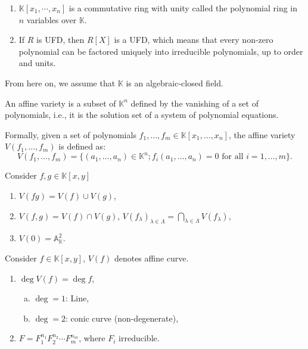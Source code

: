 \documentclass[10pt]{article}
\begin{document}
\begin{definition}

\end{definition}

\begin{proposition}
  \begin{enumerate}[(1)]
    \item   $ \mathbb{K}[x_1,\cdots ,x_{n}]$ is a commutative ring with unity called the polynomial ring in $ n$ variables over $ \mathbb{K}$.
    \item If $ R$ is UFD, then $ R[X]$ is a UFD, which means that every non-zero polynomial can be factored uniquely into irreducible polynomials, up to order and units.
  \end{enumerate}
\end{proposition}

From here on, we assume that $ \mathbb{K}$ is an algebraic-closed field.
\begin{definition}
  An affine variety is a subset of $ \mathbb{K}^{n}$ defined by the vanishing of a set of polynomials, i.e., it is the solution set of a system of polynomial equations.

  Formally, given a set of polynomials $ f_1, \ldots, f_m \in \mathbb{K}[x_1,\ldots,x_n]$, the affine variety $ V(f_1, \ldots, f_m)$ is defined as:
  \begin{equation*}
    V(f_1, \ldots, f_m) = \{ (a_1, \ldots, a_n) \in \mathbb{K}^{n} ; f_i(a_1, \ldots, a_n) = 0 \text{ for all } i = 1, \ldots, m \}.
  \end{equation*}
\end{definition}

\begin{proposition}
  Consider $ f, g \in \mathbb{K}[x,y]$
  \begin{enumerate}[(1)]
    \item $V(fg) = V(f) \cup V(g)$,
    \item $ V(f, g) = V(f) \cap V(g)$, $ V(f_{\lambda})_{\lambda \in \Lambda} = \bigcap_{\lambda \in \Lambda} V(f_{\lambda})$,
    \item $ V(0) = \mathbb{A}_{\mathbb{K}}^{2}$.
  \end{enumerate}
\end{proposition}

\begin{definition}
  Consider $ f \in \mathbb{K}[x,y]$, $ V(f)$ denotes affine curve.
  \begin{enumerate}[(1)]
    \item $ \deg V(f) = \deg f$,
      \begin{enumerate}[(a)]
        \item $\deg = 1$: Line,
        \item $\deg = 2$: conic curve (non-degenerate),
      \end{enumerate}
    \item $ F = F_{1}^{n_1} F_2^{n_2} \cdots F_{m}^{n_{m}}$, where $ F_{i}$ irreducible.
  \end{enumerate}
\end{definition}
\end{document}

